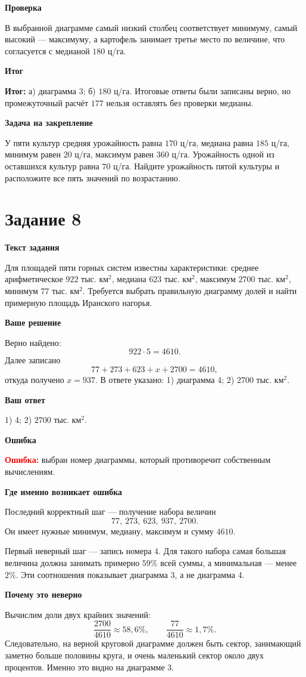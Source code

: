 \documentclass[12pt,a4paper]{article}
\newcommand{\errorlabel}{\textcolor{red}{\textbf{Ошибка:}}}
\newcommand{\resultlabel}{\textcolor{teal!60!black}{\textbf{Итог:}}}
\newcommand{\subhead}[1]{\par\medskip\textbf{#1}\par}
\begin{document}
\subhead{Проверка}
В выбранной диаграмме самый низкий столбец соответствует минимуму, самый высокий --- максимуму, а картофель занимает третье место по величине, что согласуется с медианой $180$ ц/га.

\subhead{Итог}
\resultlabel{} а) диаграмма 3; б) $180$ ц/га. Итоговые ответы были записаны верно, но промежуточный расчёт $177$ нельзя оставлять без проверки медианы.

\subhead{Задача на закрепление}
У пяти культур средняя урожайность равна $170$ ц/га, медиана равна $185$ ц/га, минимум равен $20$ ц/га, максимум равен $360$ ц/га. Урожайность одной из оставшихся культур равна $70$ ц/га. Найдите урожайность пятой культуры и расположите все пять значений по возрастанию.

\newpage
{}\label{task:8}
\section*{Задание 8}

\subhead{Текст задания}
Для площадей пяти горных систем известны характеристики: среднее арифметическое $922$ тыс. км$^2$, медиана $623$ тыс. км$^2$, максимум $2700$ тыс. км$^2$, минимум $77$ тыс. км$^2$. Требуется выбрать правильную диаграмму долей и найти примерную площадь Иранского нагорья.

\subhead{Ваше решение}
Верно найдено:
\[
922\cdot5=4610.
\]
Далее записано
\[
77+273+623+x+2700=4610,
\]
откуда получено $x=937$. В ответе указано: 1) диаграмма 4; 2) $2700$ тыс. км$^2$.

\subhead{Ваш ответ}
1) 4; 2) $2700$ тыс. км$^2$.

\subhead{Ошибка}
\errorlabel{} выбран номер диаграммы, который противоречит собственным вычислениям.

\subhead{Где именно возникает ошибка}
Последний корректный шаг --- получение набора величин
\[
77,\ 273,\ 623,\ 937,\ 2700.
\]
Он имеет нужные минимум, медиану, максимум и сумму $4610$.

Первый неверный шаг --- запись номера 4. Для такого набора самая большая величина должна занимать примерно $59\%$ всей суммы, а минимальная --- менее $2\%$. Эти соотношения показывает диаграмма 3, а не диаграмма 4.

\subhead{Почему это неверно}
Вычислим доли двух крайних значений:
\[
\frac{2700}{4610}\approx58{,}6\%,\qquad
\frac{77}{4610}\approx1{,}7\%.
\]
Следовательно, на верной круговой диаграмме должен быть сектор, занимающий заметно больше половины круга, и очень маленький сектор около двух процентов. Именно это видно на диаграмме 3.
\end{document}
